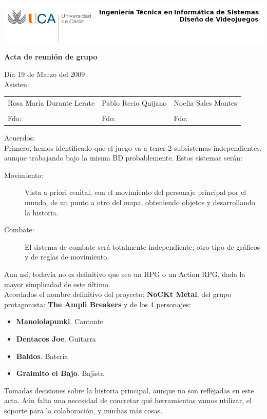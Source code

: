 \documentclass[a4paper,10pt]{article}
\begin{document}
\includegraphics[scale=0.6]{../uca.png}

\begin{center}
  \noindent \huge\textbf{ Acta de reunión de grupo}\\
\end{center}

\noindent Día 19 de Marzo del 2009\\

\noindent Asisten:

\begin{center}
\begin{tabular}{|m{5.2cm}|m{5.2cm}|m{5.2cm}|}
  \hline
  Rosa María Durante Lerate & Pablo Recio Quijano & Noelia Sales Montes\\
  & & \\[2cm]
  Fdo: & Fdo: & Fdo: \\
  \hline
\end{tabular}
\end{center}

\noindent Acuerdos:\\

\noindent Primero, hemos identificado que el juego va a tener 2
subsistemas independientes, aunque trabajando bajo la misma BD
probablemente. Estos sistemas serán:

\begin{description}
\item[Movimiento: ] Vista a priori cenital, con el movimiento del
  personaje principal por el mundo, de un punto a otro del mapa,
  obteniendo objetos y desarrollando la historia.
\item[Combate: ] El sistema de combate será totalmente independiente;
  otro tipo de gráficos y de reglas de movimiento.
\end{description}

\noindent Aun así, todavía no es definitivo que sea un RPG o un Action
RPG, dada la mayor simplicidad de este último.\\

\noindent Acordados el nombre definitivo del proyecto: \textbf{NoCKt
  Metal}, del grupo protagonista: \textbf{The Ampli Breakers} y de los
4 personajes:
\begin{itemize}
\item \textbf{Manololapunki}. Cantante
\item \textbf{Dentacos Joe}. Guitarra
\item \textbf{Baldos}. Bateria
\item \textbf{Graimito el Bajo}. Bajista
\end{itemize}

\noindent Tomadas decisiones sobre la historia principal, aunque no
son reflejadas en este acta. Aún falta una necesidad de concretar qué
herramientas vamos utilizar, el soporte para la colaboración, y muchas
más cosas.
\end{document}
